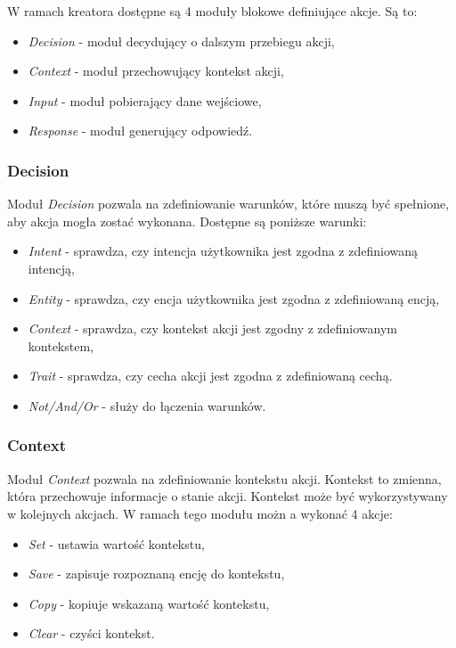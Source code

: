 W ramach kreatora dostępne są 4 moduły blokowe definiujące akcje. Są to:
\begin{itemize}
    \item \textit{Decision} - moduł decydujący o dalszym przebiegu akcji,
    \item \textit{Context} - moduł przechowujący kontekst akcji,
    \item \textit{Input} - moduł pobierający dane wejściowe,
    \item \textit{Response} - moduł generujący odpowiedź.
\end{itemize}

\subsubsection{Decision}

Moduł \textit{Decision} pozwala na zdefiniowanie warunków, które muszą być spełnione, aby akcja mogła zostać wykonana. Dostępne są poniższe warunki:
\begin{itemize}
    \item \textit{Intent} - sprawdza, czy intencja użytkownika jest zgodna z zdefiniowaną intencją,
    \item \textit{Entity} - sprawdza, czy encja użytkownika jest zgodna z zdefiniowaną encją,
    \item \textit{Context} - sprawdza, czy kontekst akcji jest zgodny z zdefiniowanym kontekstem,
    \item \textit{Trait} - sprawdza, czy cecha akcji jest zgodna z zdefiniowaną cechą.
    \item \textit{Not/And/Or} - służy do łączenia warunków.
\end{itemize}

\subsubsection{Context}
Moduł \textit{Context} pozwala na zdefiniowanie kontekstu akcji. Kontekst to zmienna, która przechowuje informacje o stanie akcji. Kontekst może być wykorzystywany w kolejnych akcjach. W ramach tego modułu możn a wykonać 4 akcje:
\begin{itemize}
    \item \textit{Set} - ustawia wartość kontekstu,
    \item \textit{Save} - zapisuje rozpoznaną encję do kontekstu,
    \item \textit{Copy} - kopiuje wskazaną wartość kontekstu,
    \item \textit{Clear} - czyści kontekst.
\end{itemize}

